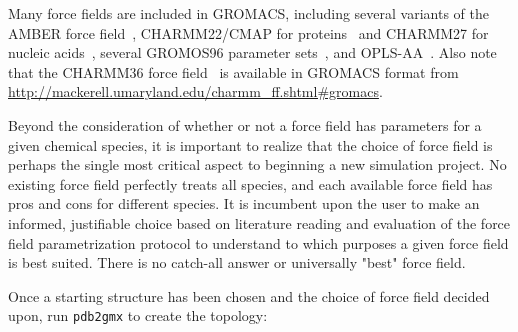 \documentclass[9pt,tutorial,pubversion]{livecoms}
\begin{document}
Many force fields are included in GROMACS, including several variants of the AMBER force field~\cite{Cornell1994,Kollman1996,Wang2000,Garcia2002,Duan2003,Hornak2006,LindorffLarsen2010}, CHARMM22/CMAP for proteins~\cite{MacKerell1998,MacKerell2004} and CHARMM27 for nucleic acids~\cite{Foloppe2000,MacKerell2000}, several GROMOS96 parameter sets~\cite{Daura1998,Schuler2001,Oostenbrink2004,Schmid2011}, and OPLS-AA~\cite{Kaminski2001}. Also note that the CHARMM36 force field~\cite{Best2012,Hart2012,Denning2011,Klauda2010,Huang2016} is available in GROMACS format from \url{http://mackerell.umaryland.edu/charmm_ff.shtml#gromacs}.

Beyond the consideration of whether or not a force field has parameters for a given chemical species, it is important to realize that the choice of force field is perhaps the single most critical aspect to beginning a new simulation project. No existing force field perfectly treats all species, and each available force field has pros and cons for different species. It is incumbent upon the user to make an informed, justifiable choice based on literature reading and evaluation of the force field parametrization protocol to understand to which purposes a given force field is best suited. There is no catch-all answer or universally "best" force field.

Once a starting structure has been chosen and the choice of force field decided upon, run \texttt{pdb2gmx} to create the topology:
\end{document}
